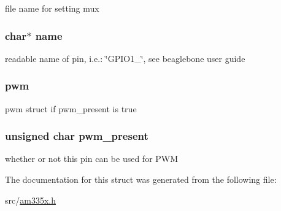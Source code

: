 file name for setting mux \hypertarget{structs___p_i_n_a5ac083a645d964373f022d03df4849c8}{
\subsubsection[{name}]{\setlength{\rightskip}{0pt plus 5cm}char$\ast$ name}}\label{structs___p_i_n_a5ac083a645d964373f022d03df4849c8}
readable name of pin, i.\-e.\-: \char`\"{}\-G\-P\-I\-O1\-\_\char`\"{}, see beaglebone user guide \hypertarget{structs___p_i_n_a6208909b76c84a75b931c78e24a0cc42}{
\subsubsection[{pwm}]{ pwm}}\label{structs___p_i_n_a6208909b76c84a75b931c78e24a0cc42}
pwm struct if pwm\-\_\-present is true \hypertarget{structs___p_i_n_ad9d4ffb703dd541884e772f4490febd9}{
\subsubsection[{pwm\-\_\-present}]{\setlength{\rightskip}{0pt plus 5cm}unsigned char pwm\-\_\-present}}\label{structs___p_i_n_ad9d4ffb703dd541884e772f4490febd9}
whether or not this pin can be used for P\-W\-M 

The documentation for this struct was generated from the following file\-:\begin{DoxyCompactItemize}
\item 
src/\hyperlink{am335x_8h}{am335x.\-h}\end{DoxyCompactItemize}
